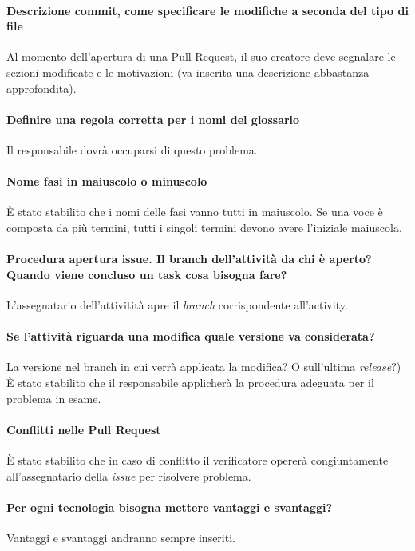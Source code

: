 \documentclass[11pt]{meetingmins}
\begin{document}
	\paragraph*{Descrizione commit, come specificare le modifiche a seconda del tipo di file}
		Al momento dell'apertura di una Pull Request, il suo creatore deve segnalare le sezioni modificate e
		le motivazioni (va inserita una descrizione abbastanza approfondita).

	\paragraph*{Definire una regola corretta per i nomi del glossario}
		Il responsabile dovr\`a occuparsi di questo problema.

	\paragraph*{Nome fasi in maiuscolo o minuscolo}
		\`E stato stabilito che i nomi delle fasi vanno tutti in maiuscolo.		
		Se una voce \`e composta da pi\`u termini, tutti i singoli termini devono avere l'iniziale maiuscola.

	\paragraph*{Procedura apertura issue. Il branch dell'attivit\`a da chi \`e aperto? Quando viene concluso un task cosa bisogna fare?}
		L'assegnatario dell'attivitit\`a apre il \textit{branch} corrispondente all'activity.				

	\paragraph*{Se l'attivit\`a riguarda una modifica quale versione va considerata?}
		La versione nel branch in cui verr\`a applicata la modifica? O sull'ultima \textit{release}?)
		\`E stato stabilito che il responsabile applicher\`a la procedura adeguata per il problema in esame.	

	\paragraph*{Conflitti nelle Pull Request}
		\`E stato stabilito che in caso di conflitto il verificatore operer\`a congiuntamente all'assegnatario della
		\textit{issue} per risolvere problema.		
	        
	

	\paragraph*{Per ogni tecnologia bisogna mettere vantaggi e svantaggi?}
		Vantaggi e svantaggi andranno sempre inseriti.
\end{document}
